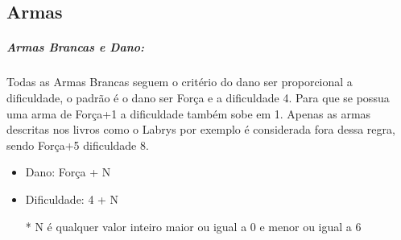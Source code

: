 \subsection{\bf Armas}

\subparagraph{\bf Armas Brancas e Dano:}
Todas as Armas Brancas seguem o critério do dano ser proporcional a dificuldade, o padrão é o dano ser Força e a dificuldade 4. Para que se possua uma arma de Força+1 a dificuldade também sobe em 1. Apenas as armas descritas nos livros como o Labrys por exemplo é considerada fora dessa regra, sendo Força+5 dificuldade 8.
\begin{itemize}[noitemsep]
    \item Dano: Força + N
    \item Dificuldade: 4 + N
    \item[*] N é qualquer valor inteiro maior ou igual a 0 e menor ou igual a 6
\end{itemize}